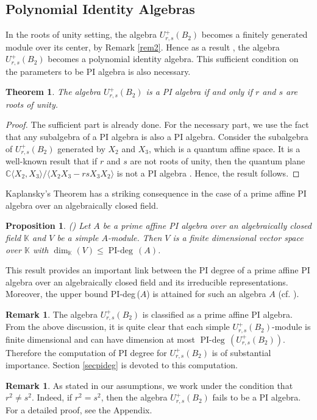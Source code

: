 \documentclass[12 pt,reqno]{amsart}
\numberwithin{equation}{section}
\DeclareMathOperator{\pideg}{PI-deg}
\DeclareMathOperator{\dime}{dim}
\newtheorem{theorem}[thm]{Theorem}
\newtheorem{prop}[thm]{Proposition}
\theoremstyle{definition}
\newtheorem{remark}[thm]{Remark}
\theoremstyle{definition}
\theoremstyle{remark}
\theoremstyle{remark}
\begin{document}
\subsection{Polynomial Identity Algebras} In the roots of unity setting, the algebra $ U_{r,s}^+(B_2)$ becomes a finitely generated module over its center, by Remark \ref{rem2}. Hence as a result \cite[Corollary 13.1.13]{mcr}, the algebra $ U_{r,s}^+(B_2)$ becomes a polynomial identity algebra. This sufficient condition on the parameters to be PI algebra is also necessary.
\begin{theorem}\label{m1}
    The algebra $ U_{r,s}^+(B_2)$ is a PI algebra if and only if $r$ and $s$ are roots of unity.
\end{theorem}
\begin{proof}
    The sufficient part is already done. For the necessary part, we use the fact that any subalgebra of a PI algebra is also a PI algebra. Consider the subalgebra of $ U_{r,s}^+(B_2)$ generated by $X_2$ and $X_3$, which is a quantum affine space. It is a well-known result that if $r$ and $s$ are not roots of unity, then the quantum plane $\mathbb{C}\langle X_2,X_3\rangle /\langle X_2X_3-rsX_3X_2\rangle$ is not a PI algebra \cite[Proposition I.14.2]{brg}. Hence, the result follows.
\end{proof}
Kaplansky's Theorem has a striking consequence in the case of a prime affine PI algebra over an algebraically closed field.
\begin{prop}\label{pidimresult}\emph{(\cite[Theorem I.13.5]{brg})}
Let $A$ be a prime affine PI algebra over an algebraically closed field $\mathbb{K}$ and $V$ be a simple $A$-module. Then $V$ is a finite dimensional vector space over $\mathbb{K}$ with $\dime_{\mathbb{K}}(V)\leq \pideg \,(A)$.
\end{prop} 
This result provides an important link between the PI degree of a prime affine PI algebra over an algebraically closed field and its irreducible representations. Moreover, the upper bound PI-deg\,($A$) is attained for such an algebra $A$ (cf. \cite[Lemma III.1.2]{brg}). 
\begin{remark}\label{fdb}
The algebra $ U_{r,s}^+(B_2)$ is classified as a prime affine PI algebra. From the above discussion, it is quite clear that each simple $ U_{r,s}^+(B_2)$-module is finite dimensional and can have dimension at most $\pideg \,\left({ U_{r,s}^+(B_2)}\right)$. Therefore the computation of PI degree for $ U_{r,s}^+(B_2)$ is of substantial importance. Section \ref{secpideg} is devoted to this computation. 
\end{remark}
\begin{remark}
    As stated in our assumptions, we work under the condition that $ r^2 \neq s^2$. Indeed, if $r^2 = s^2$, then the algebra $U_{r,s}^+(B_2)$ fails to be a PI algebra. For a detailed proof, see the Appendix.

\end{remark}
\end{document}
